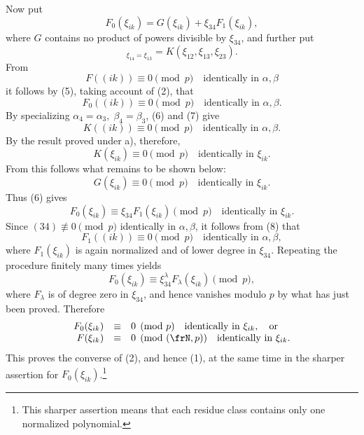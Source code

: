\documentclass[11pt]{article}
\begin{document}
Now put
\begin{equation}
        F_0(\xi_{ik})=G(\xi_{ik})+\xi_{34}F_1(\xi_{ik}),
\end{equation}
where \(G\) contains no product of powers divisible by \(\xi_{34}\), and further put
\begin{equation}
        [G]_{\xi_{14}=\xi_{13}}=K(\xi_{12},\xi_{13},\xi_{23}).
\end{equation}
From
\[
        F((ik))\equiv0\pmod p\quad \text{identically in \(\alpha,\beta\)}
\]
it follows by (5), taking account of (2), that
\begin{equation}
        F_0((ik))\equiv0\pmod p\quad \text{identically in \(\alpha,\beta\)}.
\end{equation}
By specializing \(\alpha_4=\alpha_3,\;\beta_4=\beta_3\), (6) and (7) give
\[
        K((ik))\equiv0\pmod p\quad \text{identically in \(\alpha,\beta\)}.
\]
By the result proved under a), therefore,
\[
        K(\xi_{ik})\equiv0\pmod p\quad \text{identically in \(\xi_{ik}\)}.
\]
From this follows what remains to be shown below:
\[
        G(\xi_{ik})\equiv0\pmod p\quad \text{identically in \(\xi_{ik}\)}.
\]
Thus (6) gives
\[
        F_0(\xi_{ik})\equiv \xi_{34}F_1(\xi_{ik})\pmod p
        \quad \text{identically in \(\xi_{ik}\)}.
\]
Since \((34)\not\equiv0\pmod p\) identically in \(\alpha,\beta\), it follows from (8) that
\[
        F_1((ik))\equiv0\pmod p\quad \text{identically in \(\alpha,\beta\)},
\]
where \(F_1(\xi_{ik})\) is again normalized and of lower degree in \(\xi_{34}\). Repeating the procedure finitely many times yields
\[
        F_0(\xi_{ik})\equiv\xi_{34}^{\lambda}F_\lambda(\xi_{ik})\pmod p,
\]
where \(F_\lambda\) is of degree zero in \(\xi_{34}\), and hence vanishes modulo \(p\) by what has just been proved. Therefore
\begin{equation}
\begin{array}{rcl}
        F_0(\xi_{ik})&\equiv&0\pmod p\quad \text{identically in \(\xi_{ik}\)},\quad\text{or}\\
        F(\xi_{ik})&\equiv&0\pmod{(\frN,p)}\quad \text{identically in \(\xi_{ik}\)}.
\end{array}
\end{equation}
This proves the converse of (2), and hence (1), at the same time in the sharper assertion for \(F_0(\xi_{ik})\).\footnote{This sharper assertion means that each residue class contains only one normalized polynomial.}
\end{document}
